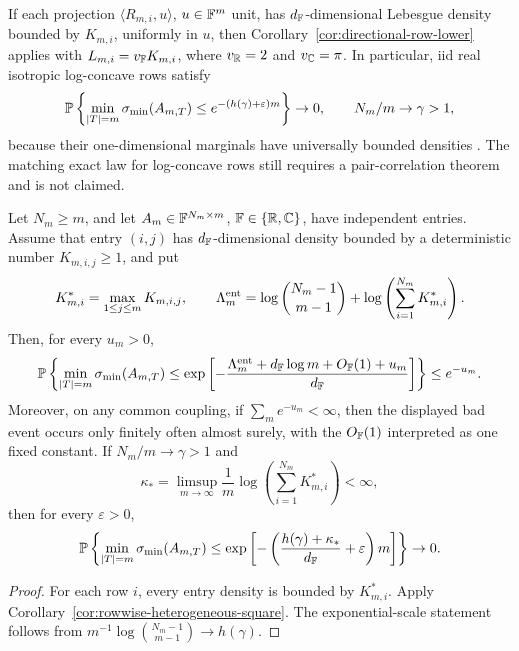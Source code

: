 \begin{corollary}\label{cor:logconcave-lower}
If each projection \(\langle R_{m,i},u\rangle\), \(u\in\mathbb{F}^m\) unit, has
\(d_{\mathbb{F}}\)-dimensional Lebesgue density bounded by \(K_{m,i}\), uniformly in
\(u\), then Corollary~\ref{cor:directional-row-lower} applies
with \(L_{m,i}=v_{\mathbb{F}} K_{m,i}\), where \(v_{\mathbb{R}}=2\) and \(v_{\mathbb{C}}=\pi\).  In
particular, iid real isotropic log-concave rows satisfy
\[
  \mathbb{P}\left\{\min_{|T|=m}\sigma_{\min}(A_{m,T})
  \le e^{-(h(\gamma)+\varepsilon)m}\right\}\to0,
  \qquad N_m/m\to\gamma>1,
\]
because their one-dimensional marginals have universally bounded densities
\cite{BrazitikosGiannopoulosValettasVritsiou2014}.  The matching exact law for
log-concave rows still requires a pair-correlation theorem and is not claimed.
\end{corollary}

\begin{corollary}\label{cor:entrywise-profile-square}
Let \(N_m\ge m\), and let \(A_m\in\mathbb{F}^{N_m\times m}\),
\(\mathbb{F}\in\{\mathbb{R},\mathbb{C}\}\), have independent entries.  Assume that entry \((i,j)\)
has \(d_{\mathbb{F}}\)-dimensional density bounded by a deterministic number
\(K_{m,i,j}\ge1\), and put
\[
  K_{m,i}^*=\max_{1\le j\le m} K_{m,i,j},\qquad
  \Lambda_m^{\rm ent}
  =
  \log\binom{N_m-1}{m-1}
  +\log\left(\sum_{i=1}^{N_m}K_{m,i}^*\right).
\]
Then, for every \(u_m>0\),
\[
  \mathbb{P}\left\{
  \min_{|T|=m}\sigma_{\min}(A_{m,T})
  \le
  \exp\left[-\frac{\Lambda_m^{\rm ent}+d_{\mathbb{F}}\log m+O_{\mathbb{F}}(1)+u_m}{d_{\mathbb{F}}}\right]
  \right\}
  \le e^{-u_m}.
\]
Moreover, on any common coupling, if \(\sum_m e^{-u_m}<\infty\), then the
displayed bad event occurs only finitely often almost surely, with the
\(O_{\mathbb{F}}(1)\) interpreted as one fixed constant.
If \(N_m/m\to\gamma>1\) and
\[
  \kappa_*=\limsup_{m\to\infty}
  \frac1m\log\left(\sum_{i=1}^{N_m}K_{m,i}^*\right)<\infty ,
\]
then for every \(\varepsilon>0\),
\[
  \mathbb{P}\left\{
  \min_{|T|=m}\sigma_{\min}(A_{m,T})
  \le
  \exp\left[-\left(\frac{h(\gamma)+\kappa_*}{d_{\mathbb{F}}}
       +\varepsilon\right)m\right]\right\}\to0 .
\]
\end{corollary}

\begin{proof}
For each row \(i\), every entry density is bounded by \(K_{m,i}^*\).  Apply
Corollary~\ref{cor:rowwise-heterogeneous-square}.  The exponential-scale
statement follows from
\(m^{-1}\log\binom{N_m-1}{m-1}\to h(\gamma)\).
\end{proof}

